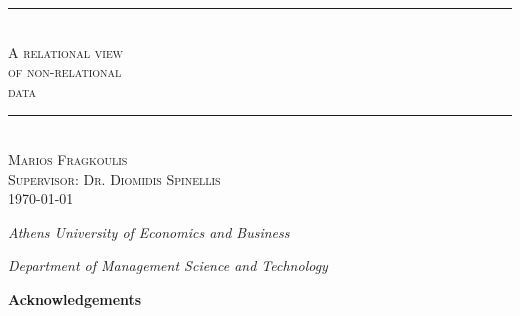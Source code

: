 \documentclass[pdftex, 11pt, a4paper]{report}
\makeatletter
\newcommand{\HRule}{\rule{\linewidth}{0.5mm}}
\newcommand\ackname{Acknowledgements}
\newenvironment{acknowledgements}{%
      \titlepage
      \null\vfil
      \@beginparpenalty\@lowpenalty
      \begin{center}%
        \bfseries \ackname
        \@endparpenalty\@M
      \end{center}}%
     {\par\vfil\null\endtitlepage}
\newenvironment{acknowledgements}{%
      \if@twocolumn
        \chapter*{\abstractname}%
      \else
        \small
        \begin{center}%
          {\bfseries \ackname\vspace{-.5em}\vspace{\z@}}%
        \end{center}%
        \quotation
      \fi}
      {\if@twocolumn\else\endquotation\fi}
\makeatother
\begin{document}
\begin{titlepage}
\begin{center}
\topskip 3cm
\HRule \\[0.4 cm]
\textsc{\Huge A relational view}\\[0.5 cm]
\textsc{\Huge of non-relational}\\[0.5 cm]
\textsc{\Huge data}\\[0.5 cm]
\textsc{\Huge }
\HRule \\[2.0 cm]
\textsc{\LARGE Marios Fragkoulis}\\[3.0 cm]
\textsc{\LARGE Supervisor: Dr. Diomidis Spinellis}\\[2.0 cm]
\textsc{\Large \today}                                           %

\vspace{3.5 cm}

\begin{minipage}{0.4\linewidth}
\begin{flushleft} \large
\it{Athens University of Economics and Business}
\end{flushleft}
\end{minipage}
\begin{minipage}{0.5\linewidth}
\begin{flushright} \large
\it{Department of Management Science and Technology}
\end{flushright}
\end{minipage}

\vfill

\end{center}
\end{titlepage}



\parindent 6mm
\parskip 0.2cm


\begin{abstract}

\end{abstract}

\topmargin 0.5cm
\textheight 21cm

\newpage

\begin{acknowledgements}



\end{acknowledgements}
\end{document}
